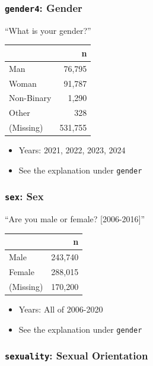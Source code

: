 \documentclass[10pt,article,oneside]{memoir}
\begin{document}
\subsubsection{\texorpdfstring{\texttt{gender4}:
Gender}{gender4: Gender}}\label{gender4-gender}

``What is your gender?''

\begin{table}[H]
\centering
\begin{tabular}[t]{lr}
\toprule
 & n\\
\midrule
Man & 76,795\\
Woman & 91,787\\
Non-Binary & 1,290\\
Other & 328\\
(Missing) & 531,755\\
\bottomrule
\end{tabular}
\end{table}

\begin{itemize}
\tightlist
\item
  Years: 2021, 2022, 2023, 2024
\item
  See the explanation under \texttt{gender}
\end{itemize}

\subsubsection{\texorpdfstring{\texttt{sex}:
Sex}{sex: Sex}}\label{sex-sex}

``Are you male or female? {[}2006-2016{]}''

\begin{table}[H]
\centering
\begin{tabular}[t]{lr}
\toprule
 & n\\
\midrule
Male & 243,740\\
Female & 288,015\\
(Missing) & 170,200\\
\bottomrule
\end{tabular}
\end{table}

\begin{itemize}
\tightlist
\item
  Years: All of 2006-2020
\item
  See the explanation under \texttt{gender}
\end{itemize}

\subsubsection{\texorpdfstring{\texttt{sexuality}: Sexual
Orientation}{sexuality: Sexual Orientation}}\label{sexuality-sexual-orientation}
\end{document}

